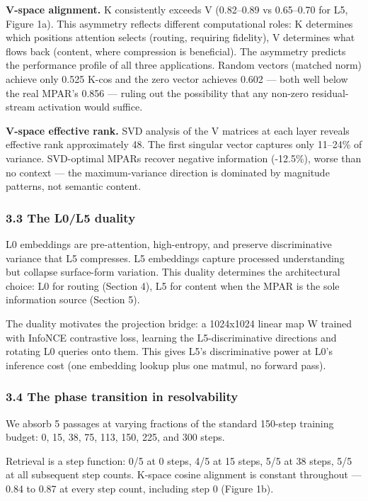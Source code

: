 \textbf{V-space alignment.} K consistently exceeds V (0.82--0.89 vs 0.65--0.70 for L5, Figure 1a). This asymmetry reflects different computational roles: K determines which positions attention selects (routing, requiring fidelity), V determines what flows back (content, where compression is beneficial). The asymmetry predicts the performance profile of all three applications. Random vectors (matched norm) achieve only 0.525 K-cos and the zero vector achieves 0.602 --- both well below the real MPAR's 0.856 --- ruling out the possibility that any non-zero residual-stream activation would suffice.

\textbf{V-space effective rank.} SVD analysis of the V matrices at each layer reveals effective rank approximately 48. The first singular vector captures only 11--24\% of variance. SVD-optimal MPARs recover negative information (-12.5\%), worse than no context --- the maximum-variance direction is dominated by magnitude patterns, not semantic content.

\subsubsection{3.3 The L0/L5 duality}\label{the-l0l5-duality}

L0 embeddings are pre-attention, high-entropy, and preserve discriminative variance that L5 compresses. L5 embeddings capture processed understanding but collapse surface-form variation. This duality determines the architectural choice: L0 for routing (Section 4), L5 for content when the MPAR is the sole information source (Section 5).

The duality motivates the projection bridge: a 1024x1024 linear map W trained with InfoNCE contrastive loss, learning the L5-discriminative directions and rotating L0 queries onto them. This gives L5's discriminative power at L0's inference cost (one embedding lookup plus one matmul, no forward pass).

\subsubsection{3.4 The phase transition in resolvability}\label{the-phase-transition-in-resolvability}

We absorb 5 passages at varying fractions of the standard 150-step training budget: 0, 15, 38, 75, 113, 150, 225, and 300 steps.

Retrieval is a step function: 0/5 at 0 steps, 4/5 at 15 steps, 5/5 at 38 steps, 5/5 at all subsequent step counts. K-space cosine alignment is constant throughout --- 0.84 to 0.87 at every step count, including step 0 (Figure 1b).

